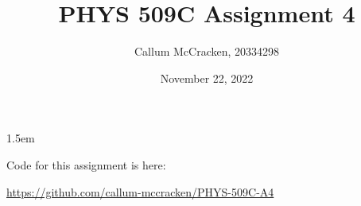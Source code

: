 \documentclass[11pt,letterpaper]{article}
\newcommand{\0}{\mathcal{O}}
\begin{document}
\thispagestyle{fancyplain}
\headheight 35pt
\author{Callum McCracken, 20334298}
\title{PHYS 509C Assignment 4}
\date{November 22, 2022}
\rfoot{\small\thepage}
\headsep 1.5em

\maketitle
\Large{Code for this assignment is here:

\url{https://github.com/callum-mccracken/PHYS-509C-A4}}

\newpage

\newpage

\newpage

\newpage

\end{document}

